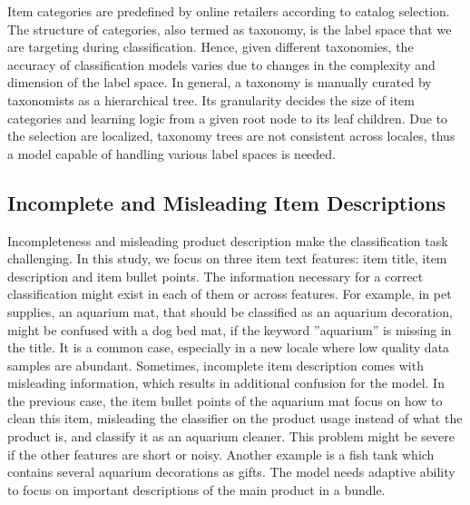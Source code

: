 \documentclass[11pt,dvipsnames]{article}
\begin{document}
Item categories are predefined by online retailers according to catalog selection. The structure of categories, also termed as taxonomy, is the label space that we are targeting during classification. Hence, given different taxonomies, the accuracy of classification models varies due to changes in the complexity and dimension of the label space. In general, a taxonomy is manually curated by taxonomists as a hierarchical tree. Its granularity decides the size of item categories and learning logic from a given root node to its leaf children. Due to the selection are localized, taxonomy trees are not consistent across locales, thus a model capable of handling various label spaces is needed. 

\subsection{Incomplete and Misleading Item Descriptions}
Incompleteness and misleading product description make the classification task challenging. In this study, we focus on three item text features: item title, item description and item bullet points. The information necessary for a correct classification might exist in each of them or across features. For example, in pet supplies, an aquarium mat, that should be classified as an aquarium decoration, might be confused with a dog bed mat, if the keyword ”aquarium” is missing in the title. It is a common case, especially in a new locale where low quality data samples are abundant. Sometimes, incomplete item description comes with misleading information, which results in additional confusion for the model. In the previous case, the item bullet points of the aquarium mat focus on how to clean this item, misleading the classifier on the product usage instead of what the product is, and classify it as an aquarium cleaner. This problem might be severe if the other features are short or noisy. Another example is a fish tank which contains several aquarium decorations as gifts. The model needs adaptive ability to focus on important descriptions of the main product in a bundle. 
\end{document}
